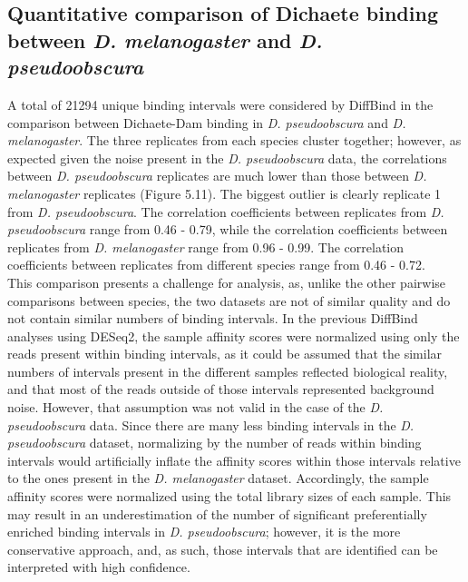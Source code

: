 \subsection{Quantitative comparison of Dichaete binding between \emph{D. melanogaster} and \emph{D. pseudoobscura}}
A total of 21294 unique binding intervals were considered by DiffBind in the comparison between Dichaete-Dam binding in \emph{D. pseudoobscura} and \emph{D. melanogaster}. The three replicates from each species cluster together; however, as expected given the noise present in the \emph{D. pseudoobscura} data, the correlations between \emph{D. pseudoobscura} replicates are much lower than those between \emph{D. melanogaster} replicates (Figure 5.11). The biggest outlier is clearly replicate 1 from \emph{D. pseudoobscura}. The correlation coefficients between replicates from \emph{D. pseudoobscura} range from 0.46 - 0.79, while the correlation coefficients between replicates from \emph{D. melanogaster} range from 0.96 - 0.99. The correlation coefficients between replicates from different species range from 0.46 - 0.72.\\

This comparison presents a challenge for analysis, as, unlike the other pairwise comparisons between species, the two datasets are not of similar quality and do not contain similar numbers of binding intervals. In the previous DiffBind analyses using DESeq2, the sample affinity scores were normalized using only the reads present within binding intervals, as it could be assumed that the similar numbers of intervals present in the different samples reflected biological reality, and that most of the reads outside of those intervals represented background noise. However, that assumption was not valid in the case of the \emph{D. pseudoobscura} data. Since there are many less binding intervals in the \emph{D. pseudoobscura} dataset, normalizing by the number of reads within binding intervals would artificially inflate the affinity scores within those intervals relative to the ones present in the \emph{D. melanogaster} dataset. Accordingly, the sample affinity scores were normalized using the total library sizes of each sample. This may result in an underestimation of the number of significant preferentially enriched binding intervals in \emph{D. pseudoobscura}; however, it is the more conservative approach, and, as such, those intervals that are identified can be interpreted with high confidence.\\

